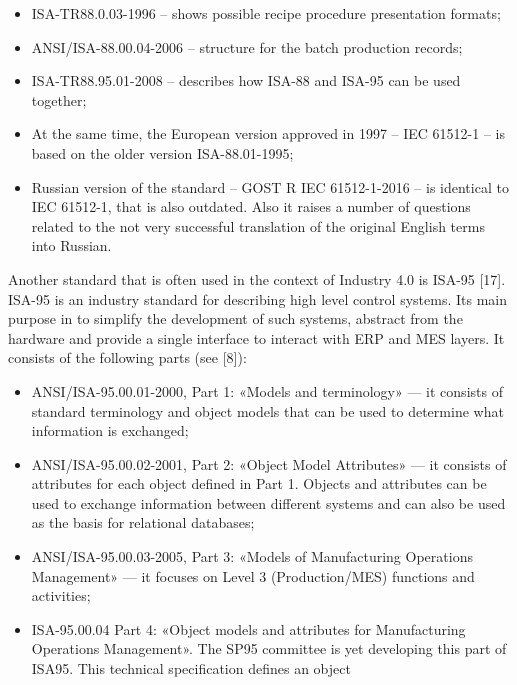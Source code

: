 \documentclass{article}
\begin{document}
\begin{multicols}{2}
\begin{itemize}
    \renewcommand{\labelitemi}{5)}
    \item ISA-TR88.0.03-1996 – shows possible recipe procedure presentation formats;
\renewcommand{\labelitemi}{6)}
    \item ANSI/ISA-88.00.04-2006 – structure for the batch production records;
\renewcommand{\labelitemi}{7)}
    \item ISA-TR88.95.01-2008 – describes how ISA-88 and ISA-95 can be used together;
\renewcommand{\labelitemi}{8)}
    \item At the same time, the European version approved in 1997 – IEC 61512-1 – is based on the older version ISA-88.01-1995;
\renewcommand{\labelitemi}{9)}
    \item Russian version of the standard – GOST R IEC 61512-1-2016 – is identical to IEC 61512-1, that is also outdated. Also it raises a number of questions related to the not very successful translation of the original English terms into Russian.
\end{itemize}
\par
Another standard that is often used in the context
of Industry 4.0 is ISA-95 [17]. ISA-95 is an industry
standard for describing high level control systems. Its
main purpose in to simplify the development of such
systems, abstract from the hardware and provide a single
interface to interact with ERP and MES layers. It consists
of the following parts (see [8]):
\begin{itemize}
    \renewcommand{\labelitemi}{1)}
    \item ANSI/ISA-95.00.01-2000, Part 1: «Models and terminology» — it consists of standard terminology and
object models that can be used to determine what
information is exchanged;
    \renewcommand{\labelitemi}{2)}
    \item ANSI/ISA-95.00.02-2001, Part 2: «Object Model
Attributes» — it consists of attributes for each object
defined in Part 1. Objects and attributes can be used
to exchange information between different systems
and can also be used as the basis for relational
databases;
    \renewcommand{\labelitemi}{3)}
    \item ANSI/ISA-95.00.03-2005, Part 3: «Models of Manufacturing Operations Management» — it focuses on
Level 3 (Production/MES) functions and activities;
    \renewcommand{\labelitemi}{4)}
    \item ISA-95.00.04 Part 4: «Object models and attributes
for Manufacturing Operations Management». The
SP95 committee is yet developing this part of ISA95. This technical specification defines an object

\end{itemize}
\end{multicols}
\end{document}
